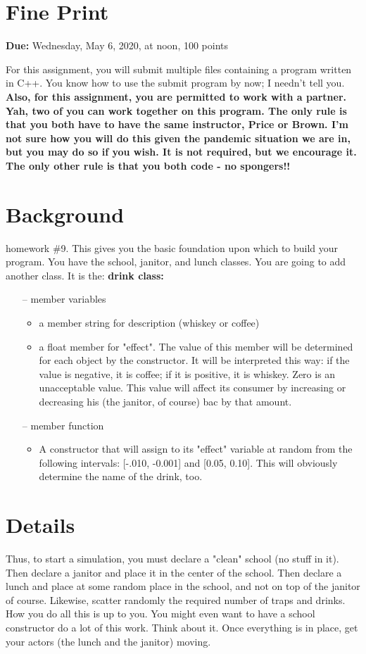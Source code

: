 \documentclass[
    subject = {{Comp Sci}},
    course = {{1570}},
    section = {{101}},
    assignment = {{Assignment 10 \\ Final Project}},
    name = {{Student One ; Student Two}},
    email = {{stosid@mst.edu ; sttsid@mst.edu}}
]{eey-homework}
\begin{document}
\section{Fine Print}
\textbf{Due:} Wednesday, May 6, 2020, at noon, 100 points

For this assignment, you will submit multiple files containing a program written in C++.
You know how to use the submit program by now; I needn't tell you.
\textbf{
    Also, for this assignment, you are permitted to work with a partner.
    Yah, two of you can work together on this program.
    The only rule is that you both have to have the same instructor, Price or Brown.
    I'm not sure how you will do this given the pandemic situation we are in, but you may do so if you wish.
    It is not required, but we encourage it.
    The only other rule is that you both code - no spongers!!
}

\section{Background}
homework \#9.
This gives you the basic foundation upon which to build your program.
You have the school, janitor, and lunch classes.
You are going to add another class. It is the: \textbf{drink class:}
\begin{itemize}
    \item[--]{member variables}
    \begin{itemize}
        \item{a member string for description (whiskey or coffee)}
        \item{a float member for "effect". The value of this member will be determined for each object by the constructor. It will be interpreted this way: if the value is negative, it is coffee; if it is positive, it is whiskey. Zero is an unacceptable value. This value will affect its consumer by increasing or decreasing his (the janitor, of course) bac by that amount.}
    \end{itemize}
    \item[--]{member function}
    \begin{itemize}
        \item{A constructor that will assign to its "effect" variable at random from the following intervals: [-.010, -0.001] and [0.05, 0.10]. This will obviously determine the name of the drink, too.}
    \end{itemize}
\end{itemize}

\section{Details}
Thus, to start a simulation, you must declare a "clean" school (no stuff in it).
Then declare a janitor and place it in the center of the school.
Then declare a lunch and place at some random place in the school, and not on top of the janitor of course.
Likewise, scatter  randomly the required number of traps and drinks.
How you do all this is up to you.
You might even want to have a school constructor do a lot of this work.
Think about it.
Once everything is in place, get your actors (the lunch and the janitor) moving.\hfill\break
\end{document}
